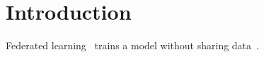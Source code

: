 \section{Introduction}
Federated learning~\cite{mcmahan} trains a model without sharing data~\cite{ghost}.
